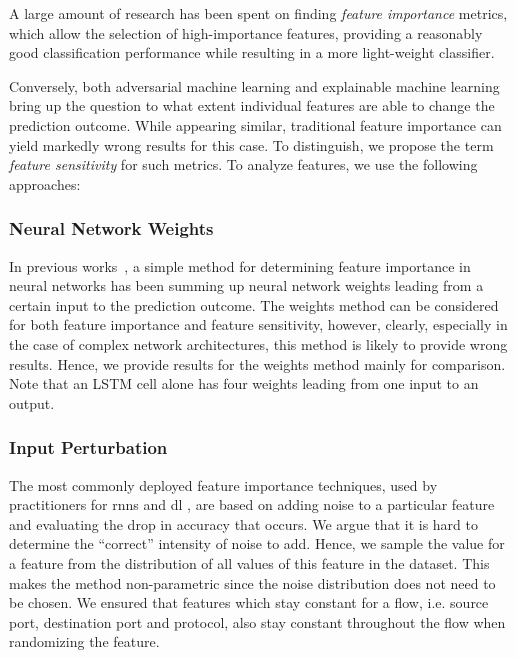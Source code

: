 \documentclass[conference]{IEEEtran}
\begin{document}
A large amount of research has been spent on finding \emph{feature importance} metrics, which allow the selection  of high-importance features, providing a reasonably good classification performance while resulting in a more light-weight classifier.

Conversely, both adversarial machine learning and explainable machine learning bring up the question to what extent individual features are able to change the prediction outcome. While appearing similar, traditional feature importance can yield markedly wrong results for this case.  To distinguish, we propose the term \emph{feature sensitivity} for such metrics.
To analyze features, we use the following approaches:

\subsubsection{Neural Network Weights}
In previous works~\cite{olden_accurate_2004}, a simple method for determining feature importance in neural networks has been summing up neural network weights leading from a certain input to the prediction outcome. The weights method can be considered for both feature importance and feature sensitivity, however, clearly, especially in the case of complex network architectures, this method is likely to provide wrong results. Hence, we provide results for the weights method mainly for comparison. Note that an LSTM cell alone has four weights leading from one input to an output.

\subsubsection{Input Perturbation}

The most commonly deployed feature importance techniques, used by practitioners for \glspl{rnn} \cite{stackexchange_cross_validated_neural_2019} and \gls{dl} \cite{molnar_interpretable_2019,stackexchange_cross_validated_feature_2016,olden_accurate_2004}, are based on adding noise to a particular feature and evaluating the drop in accuracy that occurs. We argue that it is hard to determine the ``correct'' intensity of noise to add. %
 Hence, we sample the value for a feature from the distribution of all values of this feature in the dataset. This makes the method non-parametric since the noise distribution  does not need to be chosen. We ensured that features which stay constant for a flow, i.e. source port, destination port and protocol, also stay constant throughout the flow when randomizing the feature.
\end{document}
